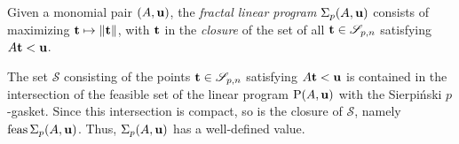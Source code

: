 \documentclass[11pt]{amsart}
\begin{document}
\begin{definition}
Given a monomial pair $(A, \mathbf{u})$, the \emph{fractal linear program} $\Sigma_p(A,\mathbf{u})$ consists of maximizing $\mathbf{t}\mapsto \| \mathbf{t} \|$, with $\mathbf{t}$ in the \emph{closure} of the set of all $\mathbf{t}\in \mathscr{S}_{p,n}$ satisfying $A\mathbf{t} < \mathbf{u}$.
\end{definition}

\begin{remark}
   The set $\mathcal{S}$ consisting of the points $\mathbf{t}\in \mathscr{S}_{p,n}$ satisfying $A\mathbf{t} < \mathbf{u}$ is contained in the intersection of the feasible set of the linear program $\mathrm{P}(A, \mathbf{u})$ with the Sierpi\'nski $p$-gasket.
   Since this intersection is compact, so is the closure of $\mathcal{S}$, namely $\operatorname{feas}\Sigma_p(A,\mathbf{u})$.
   Thus, $\Sigma_p(A,\mathbf{u})$ has a well-defined value.
\end{remark}
\end{document}
